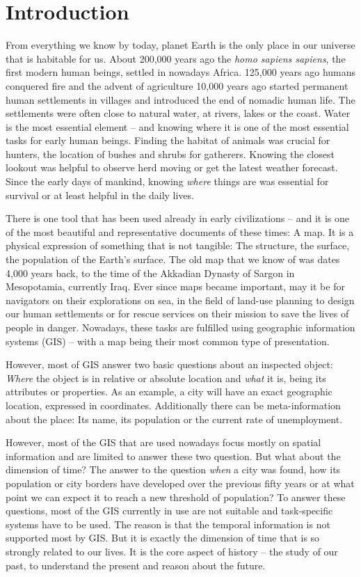 
\section{Introduction}
\label{sec:introduction}
From everything we know by today, planet Earth is the only place in our universe that is habitable for us. About 200,000 years ago the \emph{homo sapiens sapiens}, the first modern human beings, settled in nowadays Africa. 125,000 years ago humans conquered fire and the advent of agriculture 10,000 years ago started permanent human settlements in villages and introduced the end of nomadic human life. The settlements were often close to natural water, at rivers, lakes or the coast. Water is the most essential element -- and knowing where it is one of the most essential tasks for early human beings. Finding the habitat of animals was crucial for hunters, the location of bushes and shrubs for gatherers. Knowing the closest lookout was helpful to observe herd moving or get the latest weather forecast. Since the early days of mankind, knowing \emph{where} things are was essential for survival or at least helpful in the daily lives.

There is one tool that has been used already in early civilizations -- and it is one of the most beautiful and representative documents of these times: A map. It is a physical expression of something that is not tangible: The structure, the surface, the population of the Earth's surface. The old map that we know of was dates 4,000 years back, to the time of the Akkadian Dynasty of Sargon in Mesopotamia, currently Iraq. Ever since maps became important, may it be for navigators on their explorations on sea, in the field of land-use planning to design our human settlements or for rescue services on their mission to save the lives of people in danger. Nowadays, these tasks are fulfilled using geographic information systems (GIS) -- with a map being their most common type of presentation.

However, most of GIS answer two basic questions about an inspected object: \emph{Where} the object is in relative or absolute location and \emph{what} it is, being its attributes or properties. As an example, a city will have an exact geographic location, expressed in coordinates. Additionally there can be meta-information about the place: Its name, its population or the current rate of unemployment.

However, most of the GIS that are used nowadays focus mostly on spatial information and are limited to answer these two question. But what about the dimension of time? The answer to the question \emph{when} a city was found, how its population or city borders have developed over the previous fifty years or at what point we can expect it to reach a new threshold of population? To answer these questions, most of the GIS currently in use are not suitable and task-specific systems have to be used. The reason is that the temporal information is not supported most by GIS. But it is exactly the dimension of time that is so strongly related to our lives. It is the core aspect of history -- the study of our past, to understand the present and reason about the future.

